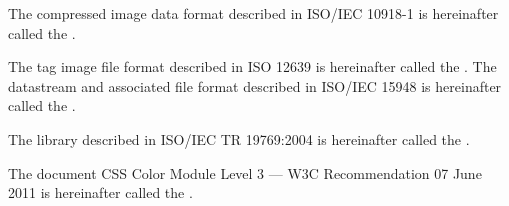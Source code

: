 \pnum
The compressed image data format described in ISO/IEC 10918-1 is hereinafter called the .

\pnum
The tag image file format described in ISO 12639 is hereinafter called the .
\pnum
The datastream and associated file format described in ISO/IEC 15948 is hereinafter called the .

\pnum
The library described in ISO/IEC TR 19769:2004 is hereinafter called the
.

\pnum
The document CSS Color Module Level 3 --- W3C Recommendation 07 June 2011 is 
hereinafter called the .

